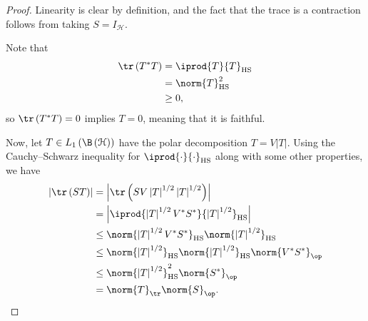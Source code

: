 \documentclass[10pt]{mypackage}
\DeclareMathOperator{\hs}{HS}
\begin{document}
\begin{proof}
  Linearity is clear by definition, and the fact that the trace is a contraction follows from taking $S = I_{\mathcal{H}}$.\newline

  Note that
  \begin{align*}
    \tr\left( T^{\ast}T \right) &= \iprod{T}{T}_{\hs}\\
                                &= \norm{T}_{\hs}^2\\
                                &\geq 0,
  \end{align*}
  so $\tr\left( T^{\ast}T \right) = 0$ implies $T = 0$, meaning that it is faithful.\newline

  Now, let $T\in L_1\left( \B\left( \mathcal{H} \right) \right)$ have the polar decomposition $T = V\left\vert T \right\vert$. Using the Cauchy--Schwarz inequality for $ \iprod{\cdot}{\cdot}_{\hs} $ along with some other properties, we have
  \begin{align*}
    \left\vert \tr\left( ST \right) \right\vert &= \left\vert \tr\left( SV\left\vert T \right\vert^{1/2}\left\vert T \right\vert^{1/2} \right) \right\vert\\
                                                &= \left\vert \iprod{\left\vert T \right\vert^{1/2}V^{\ast}S^{\ast}}{\left\vert T \right\vert^{1/2}}_{\hs} \right\vert\\
                                                &\leq \norm{\left\vert T \right\vert^{1/2}V^{\ast}S^{\ast}}_{\hs}\norm{\left\vert T \right\vert^{1/2}}_{\hs}\\
                                                &\leq \norm{\left\vert T \right\vert^{1/2}}_{\hs}\norm{\left\vert T \right\vert^{1/2}}_{\hs}\norm{V^{\ast}S^{\ast}}_{\op}\\
                                                &\leq \norm{\left\vert T \right\vert^{1/2}}_{\hs}^2 \norm{S^{\ast}}_{\op}\\
                                                &= \norm{T}_{\tr}\norm{S}_{\op}.
  \end{align*}
\end{proof}
\end{document}
